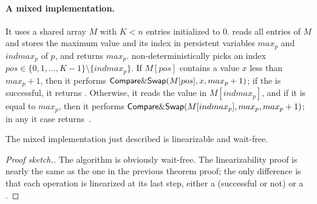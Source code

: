 \paragraph{A mixed implementation.}
It uses a shared array $M$ with $K < n$ entries initialized to 0.  \LL reads all entries of $M$ and stores the maximum value and its index in persistent variables $max_p$ and $indmax_p$ of $p$, and returns $max_p$.  \IC non-deterministically picks an index $pos \in \{0,1,\hdots,K-1\} \setminus \{indmax_p\}$.  If $M[pos]$ contains a value $x$ less than $max_p+1$, then it performs ${\sf \small Compare\&Swap}(M[pos], x, max_p+1)$; if the \CAS is successful, it returns \ok.  Otherwise, it reads the value in $M[indmax_p]$, and if it is equal to $max_p$, then it performs ${\sf \small Compare\&Swap}(M[indmax_p], max_p, max_p+1)$; in any it case returns~\ok.

\begin{theorem}
  The mixed implementation just described is linearizable and wait-free.
\end{theorem}

\begin{proof}[Proof sketch.]
  The algorithm is obviously wait-free.  The linearizability proof is nearly the same as the one in the previous theorem proof; the only difference is that each \IC operation is linearized at its last step, either a \CAS (successful or not) or a \R.
\end{proof}


